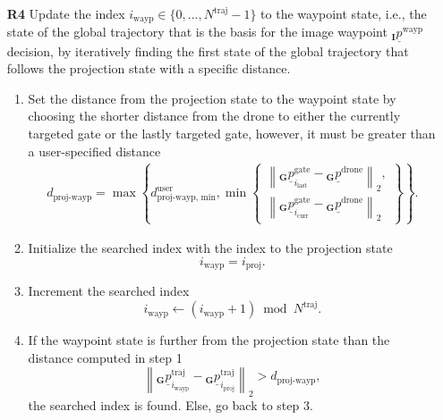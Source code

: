 \begin{itemize}
    \item [\textbf{R4}] 
    Update the index 
    $i_\text{wayp} \in \{0, ..., N^\text{traj}-1\}$ 
    to the waypoint state,
    i.e., the state of the global trajectory
    that is the basis for the image waypoint
    ${}_\textbf{I} \underline p^\text{wayp}$  decision,
    by iteratively finding the first state of the global trajectory 
    that follows the projection state
    with a specific distance.
    \begin{enumerate}
        \item Set the distance from the projection state to the waypoint state
        by choosing the shorter distance from the drone to
        either the currently targeted gate
        or the lastly targeted gate,
        however, it must be greater than a user-specified distance
        \begin{align}
            d_\text{proj-wayp} 
            = 
            \max 
            \left\{
                d^\text{user}_\text{proj-wayp, min}, 
                \min 
                \left\{
                    \substack{
                        \left\| 
                            {}_\textbf{G} \underline p^\text{gate}_{i_\text{last}}
                            -
                            {}_\textbf{G} \underline p^\text{drone}
                        \right\|_2,
                    \\
                        \left\| 
                        {}_\textbf{G} \underline p^\text{gate}_{i_\text{curr}}
                        -
                        {}_\textbf{G} \underline p^\text{drone}
                        \right\|_2 
                    }
                \right\} 
            \right\}
            .
        \end{align}
        \item Initialize the searched index with the index to the projection state
        \begin{equation}
            i_\text{wayp} = i_\text{proj}.
        \end{equation}
        \item Increment the searched index
        \begin{equation}
            i_\text{wayp} \leftarrow (i_\text{wayp} + 1) \bmod N^\text{traj}.
        \end{equation}
        \item If the waypoint state is further from the projection state 
        than the distance computed in step 1
        \begin{equation}
            \left\| 
                {}_\textbf{G} \underline p^\text{traj}_{i_\text{wayp}} 
                - 
                {}_\textbf{G} \underline p^\text{traj}_{i_\text{proj}} 
            \right\|_2
            > 
            d_\text{proj-wayp},
        \end{equation}
        the searched index is found.
        Else, go back to step 3.
    \end{enumerate}



\end{itemize}
